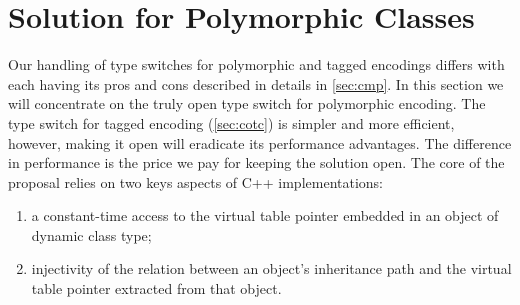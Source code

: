 \documentclass[preprint]{sigplanconf}
\makeatletter
\DeclareRobustCommand{\code}[1]{{\lstinline[breaklines=false,escapechar=@]{#1}}}
\makeatother
\begin{document}

%

%

\section{Solution for Polymorphic Classes}
\label{sec:copc}

Our handling of type switches for polymorphic and tagged encodings differs 
with each having its pros and cons described in details in \textsection\ref{sec:cmp}.
In this section we will concentrate on the truly open type switch for 
polymorphic encoding. The type switch for tagged encoding (\textsection\ref{sec:cotc}) 
is simpler and more efficient, however, making it open will eradicate its 
performance advantages. The difference in performance is the price we pay for 
keeping the solution open.  The core of the proposal relies on two keys
aspects of C++ implementations:
\begin{enumerate}
\item a constant-time access to the virtual table pointer embedded in an object of
  dynamic class type;
\item injectivity of the relation between an object's inheritance path
  and the virtual table pointer extracted from that object.
\end{enumerate}
\end{document}
